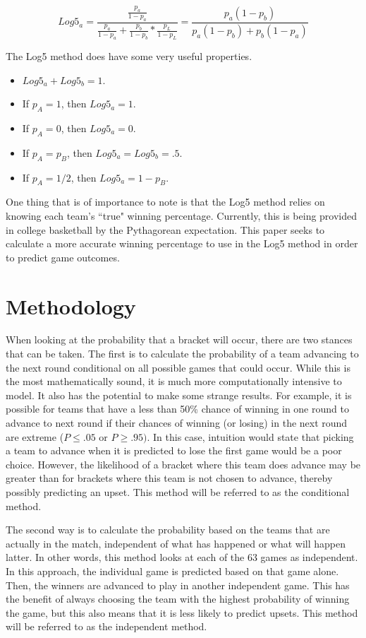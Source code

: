 \documentclass[5p, preprint]{elsarticle}
\begin{document}
\[
Log5_a = \frac{\frac{p_a}{1-p_a}}{\frac{p_a}{1-p_a} + \frac{p_b}{1-p_b} * \frac{p_L}{1-p_L}} = \frac{p_a (1 - p_b)}{p_a (1 - p_b) + p_b (1 - p_a)}
\]

The Log5 method does have some very useful properties. 

\begin{itemize}
\item $Log5_a + Log5_b = 1$.
\item If $p_A = 1$, then $Log5_a = 1$.
\item If $p_A = 0$, then $Log5_a = 0$.
\item If $p_A = p_B$, then $Log5_a = Log5_b = .5$.
\item If $p_A = 1/2$, then $Log5_a = 1-p_B$.
\end{itemize}


One thing that is of importance to note is that the Log5 method relies on knowing each team's ``true" winning percentage. Currently, this is being provided in college basketball by the Pythagorean expectation. This paper seeks to calculate a more accurate winning percentage to use in the Log5 method in order to predict game outcomes.


\section{Methodology}

When looking at the probability that a bracket will occur, there are two stances that can be taken. The first is to calculate the probability of a team advancing to the next round conditional on all possible games that could occur. While this is the most mathematically sound, it is much more computationally intensive to model. It also has the potential to make some strange results. For example, it is possible for teams that have a less than 50\% chance of winning in one round to advance to next round if their chances of winning (or losing) in the next round are extreme ($P \leq .05 \mbox{ or }  P \geq .95)$. In this case, intuition would state that picking a team to advance when it is predicted to lose the first game would be a poor choice. However, the likelihood of a bracket where this team does advance may be greater than for brackets where this team is not chosen to advance, thereby possibly predicting an upset. This method will be referred to as the conditional method.

The second way is to calculate the probability based on the teams that are actually in the match, independent of what has happened or what will happen latter. In other words, this method looks at each of the 63 games as independent. In this approach, the individual game is predicted based on that game alone. Then, the winners are advanced to play in another independent game. This has the benefit of always choosing the team with the highest probability of winning the game, but this also means that it is less likely to predict upsets. This method will be referred to as the independent method.
\end{document}

